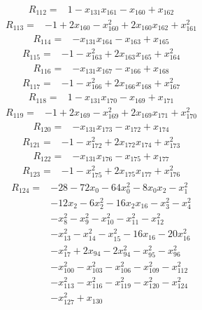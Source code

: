 \begin{align*} R_{112}={}&1 -x_{131}x_{161} -x_{160} +x_{162}
\end{align*}
\begin{align*} R_{113}={}&-1 +2 x_{160} -x_{160}^{2} +2 x_{160}x_{162} +x_{161}^{2}
\end{align*}
\begin{align*} R_{114}={}&-x_{131}x_{164} -x_{163} +x_{165}
\end{align*}
\begin{align*} R_{115}={}&-1 -x_{163}^{2} +2 x_{163}x_{165} +x_{164}^{2}
\end{align*}
\begin{align*} R_{116}={}&-x_{131}x_{167} -x_{166} +x_{168}
\end{align*}
\begin{align*} R_{117}={}&-1 -x_{166}^{2} +2 x_{166}x_{168} +x_{167}^{2}
\end{align*}
\begin{align*} R_{118}={}&1 -x_{131}x_{170} -x_{169} +x_{171}
\end{align*}
\begin{align*} R_{119}={}&-1 +2 x_{169} -x_{169}^{2} +2 x_{169}x_{171} +x_{170}^{2}
\end{align*}
\begin{align*} R_{120}={}&-x_{131}x_{173} -x_{172} +x_{174}
\end{align*}
\begin{align*} R_{121}={}&-1 -x_{172}^{2} +2 x_{172}x_{174} +x_{173}^{2}
\end{align*}
\begin{align*} R_{122}={}&-x_{131}x_{176} -x_{175} +x_{177}
\end{align*}
\begin{align*} R_{123}={}&-1 -x_{175}^{2} +2 x_{175}x_{177} +x_{176}^{2}
\end{align*}
\begin{align*} R_{124}={}&-28 -72 x_{0} -64 x_{0}^{2} -8 x_{0}x_{2} -x_{1}^{2}
\\ &-12 x_{2} -6 x_{2}^{2} -16 x_{2}x_{16} -x_{3}^{2} -x_{4}^{2}
\\ &-x_{8}^{2} -x_{9}^{2} -x_{10}^{2} -x_{11}^{2} -x_{12}^{2}
\\ &-x_{13}^{2} -x_{14}^{2} -x_{15}^{2} -16 x_{16} -20 x_{16}^{2}
\\ &-x_{17}^{2} +2 x_{94} -2 x_{94}^{2} -x_{95}^{2} -x_{96}^{2}
\\ &-x_{100}^{2} -x_{103}^{2} -x_{106}^{2} -x_{109}^{2} -x_{112}^{2}
\\ &-x_{113}^{2} -x_{116}^{2} -x_{119}^{2} -x_{120}^{2} -x_{124}^{2}
\\ &-x_{127}^{2} +x_{130}
\end{align*}
